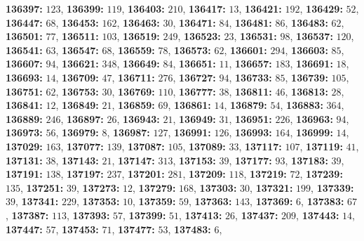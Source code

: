 \textsf{\bfseries 136397:} $123$, \textsf{\bfseries 136399:} $119$, \textsf{\bfseries 136403:} $210$, \textsf{\bfseries 136417:} $13$, \textsf{\bfseries 136421:} $192$, \textsf{\bfseries 136429:} $52$, \textsf{\bfseries 136447:} $68$, \textsf{\bfseries 136453:} $162$, \textsf{\bfseries 136463:} $30$, \textsf{\bfseries 136471:} $84$, \textsf{\bfseries 136481:} $86$, \textsf{\bfseries 136483:} $62$, \textsf{\bfseries 136501:} $77$, \textsf{\bfseries 136511:} $103$, \textsf{\bfseries 136519:} $249$, \textsf{\bfseries 136523:} $23$, \textsf{\bfseries 136531:} $98$, \textsf{\bfseries 136537:} $120$, \textsf{\bfseries 136541:} $63$, \textsf{\bfseries 136547:} $68$, \textsf{\bfseries 136559:} $78$, \textsf{\bfseries 136573:} $62$, \textsf{\bfseries 136601:} $294$, \textsf{\bfseries 136603:} $85$, \textsf{\bfseries 136607:} $94$, \textsf{\bfseries 136621:} $348$, \textsf{\bfseries 136649:} $84$, \textsf{\bfseries 136651:} $11$, \textsf{\bfseries 136657:} $183$, \textsf{\bfseries 136691:} $18$, \textsf{\bfseries 136693:} $14$, \textsf{\bfseries 136709:} $47$, \textsf{\bfseries 136711:} $276$, \textsf{\bfseries 136727:} $94$, \textsf{\bfseries 136733:} $85$, \textsf{\bfseries 136739:} $105$, \textsf{\bfseries 136751:} $62$, \textsf{\bfseries 136753:} $30$, \textsf{\bfseries 136769:} $110$, \textsf{\bfseries 136777:} $38$, \textsf{\bfseries 136811:} $46$, \textsf{\bfseries 136813:} $28$, \textsf{\bfseries 136841:} $12$, \textsf{\bfseries 136849:} $21$, \textsf{\bfseries 136859:} $69$, \textsf{\bfseries 136861:} $14$, \textsf{\bfseries 136879:} $54$, \textsf{\bfseries 136883:} $364$, \textsf{\bfseries 136889:} $246$, \textsf{\bfseries 136897:} $26$, \textsf{\bfseries 136943:} $21$, \textsf{\bfseries 136949:} $31$, \textsf{\bfseries 136951:} $226$, \textsf{\bfseries 136963:} $94$, \textsf{\bfseries 136973:} $56$, \textsf{\bfseries 136979:} $8$, \textsf{\bfseries 136987:} $127$, \textsf{\bfseries 136991:} $126$, \textsf{\bfseries 136993:} $164$, \textsf{\bfseries 136999:} $14$, \textsf{\bfseries 137029:} $163$, \textsf{\bfseries 137077:} $139$, \textsf{\bfseries 137087:} $105$, \textsf{\bfseries 137089:} $33$, \textsf{\bfseries 137117:} $107$, \textsf{\bfseries 137119:} $41$, \textsf{\bfseries 137131:} $38$, \textsf{\bfseries 137143:} $21$, \textsf{\bfseries 137147:} $313$, \textsf{\bfseries 137153:} $39$, \textsf{\bfseries 137177:} $93$, \textsf{\bfseries 137183:} $39$, \textsf{\bfseries 137191:} $138$, \textsf{\bfseries 137197:} $237$, \textsf{\bfseries 137201:} $281$, \textsf{\bfseries 137209:} $118$, \textsf{\bfseries 137219:} $72$, \textsf{\bfseries 137239:} $135$, \textsf{\bfseries 137251:} $39$, \textsf{\bfseries 137273:} $12$, \textsf{\bfseries 137279:} $168$, \textsf{\bfseries 137303:} $30$, \textsf{\bfseries 137321:} $199$, \textsf{\bfseries 137339:} $39$, \textsf{\bfseries 137341:} $229$, \textsf{\bfseries 137353:} $10$, \textsf{\bfseries 137359:} $59$, \textsf{\bfseries 137363:} $143$, \textsf{\bfseries 137369:} $6$, \textsf{\bfseries 137383:} $67$, \textsf{\bfseries 137387:} $113$, \textsf{\bfseries 137393:} $57$, \textsf{\bfseries 137399:} $51$, \textsf{\bfseries 137413:} $26$, \textsf{\bfseries 137437:} $209$, \textsf{\bfseries 137443:} $14$, \textsf{\bfseries 137447:} $57$, \textsf{\bfseries 137453:} $71$, \textsf{\bfseries 137477:} $53$, \textsf{\bfseries 137483:} $6$, 
